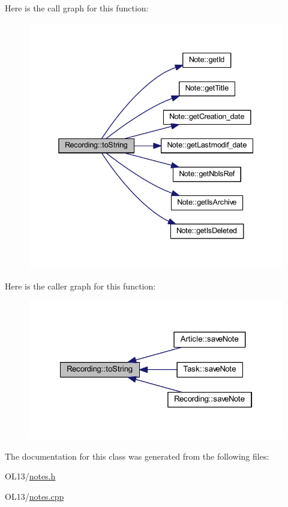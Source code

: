 Here is the call graph for this function\+:\nopagebreak
\begin{figure}[H]
\begin{center}
\leavevmode
\includegraphics[width=338pt]{class_recording_a9f403a39bec2db40c9171a6c3a20942d_cgraph}
\end{center}
\end{figure}
Here is the caller graph for this function\+:\nopagebreak
\begin{figure}[H]
\begin{center}
\leavevmode
\includegraphics[width=322pt]{class_recording_a9f403a39bec2db40c9171a6c3a20942d_icgraph}
\end{center}
\end{figure}


The documentation for this class was generated from the following files\+:\begin{DoxyCompactItemize}
\item 
O\+L13/\hyperlink{notes_8h}{notes.\+h}\item 
O\+L13/\hyperlink{notes_8cpp}{notes.\+cpp}\end{DoxyCompactItemize}
